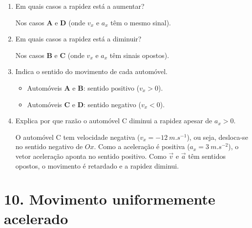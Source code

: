 \documentclass[11pt,a4paper]{article}
\begin{document}
	\begin{enumerate}[label=\textbf{\arabic*.},resume]
		
		\item Em quais casos a rapidez está a aumentar?
		
		\begin{solucao}
			Nos casos \textbf{A} e \textbf{D} (onde $v_x$ e $a_x$ têm o mesmo sinal).
		\end{solucao}
		
		\item Em quais casos a rapidez está a diminuir?
		
		\begin{solucao}
			Nos casos \textbf{B} e \textbf{C} (onde $v_x$ e $a_x$ têm sinais opostos).
		\end{solucao}
		
		\item Indica o sentido do movimento de cada automóvel.
		
		\begin{solucao}
			\begin{itemize}
				\item Automóveis \textbf{A} e \textbf{B}: sentido positivo ($v_x > 0$).
				\item Automóveis \textbf{C} e \textbf{D}: sentido negativo ($v_x < 0$).
			\end{itemize}
		\end{solucao}
		
		\item Explica por que razão o automóvel C diminui a rapidez apesar de
		$a_x>0$.
		
		\begin{solucao}
			O automóvel C tem velocidade negativa ($v_x = \SI{-12}{m.s^{-1}}$), ou seja, desloca-se no sentido negativo de $Ox$. Como a aceleração é positiva ($a_x = \SI{+3}{m.s^{-2}}$), o vetor aceleração aponta no sentido positivo. Como $\vec{v}$ e $\vec{a}$ têm sentidos opostos, o movimento é retardado e a rapidez diminui.
		\end{solucao}
		
	\end{enumerate}
	
	\section*{10. Movimento uniformemente acelerado}
	
\end{document}
